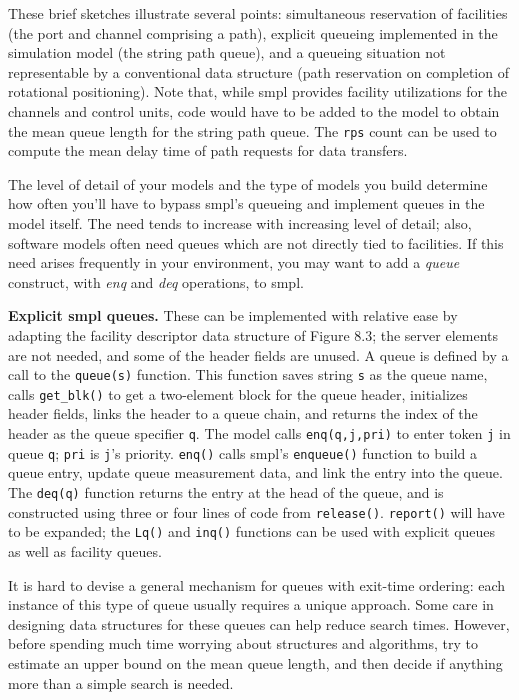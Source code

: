 These brief sketches illustrate several points: simultaneous reservation
of facilities (the port and channel comprising a path), explicit queueing
implemented in the simulation model (the string path queue), and a queueing
situation not representable by a conventional data structure (path reservation
on completion of rotational positioning). Note that, while smpl provides
facility utilizations for the channels and control units, code would
have to be added to the model to obtain the mean queue length for the string
path queue. The \texttt{rps} count can be used to compute the mean delay time of
path requests for data transfers.

The level of detail of your models and the type of models you build
determine how often you'll have to bypass smpl's queueing and implement
queues in the model itself. The need tends to increase with increasing level
of detail; also, software models often need queues which are not directly
tied to facilities. If this need arises frequently in your environment, you may
want to add a \emph{queue} construct, with \emph{enq} and \emph{deq} operations, to smpl.

\textbf{Explicit smpl queues.} These can be implemented with relative ease by
adapting the facility descriptor data structure of Figure 8.3; the server
elements are not needed, and some of the header fields are unused. A queue is
defined by a call to the \texttt{queue(s)} function. This function saves string \texttt{s} as
the queue name, calls \texttt{get\_blk()} to get a two-element block for the queue
header, initializes header fields, links the header to a queue chain, and
returns the index of the header as the queue specifier \texttt{q}. The model calls
\texttt{enq(q,j,pri)} to enter token \texttt{j} in queue \texttt{q}; \texttt{pri} is \texttt{j}'s priority. \texttt{enq()} calls
smpl's \texttt{enqueue()} function to build a queue entry, update queue measurement
data, and link the entry into the queue. The \texttt{deq(q)} function returns the
entry at the head of the queue, and is constructed using three or four lines of
code from \texttt{release()}. \texttt{report()} will have to be expanded; the \texttt{Lq()} and
\texttt{inq()} functions can be used with explicit queues as well as facility queues.

It is hard to devise a general mechanism for queues with exit-time
ordering: each instance of this type of queue usually requires a unique
approach. Some care in designing data structures for these queues can help
reduce search times. However, before spending much time worrying about
structures and algorithms, try to estimate an upper bound on the mean queue
length, and then decide if anything more than a simple search is needed.

